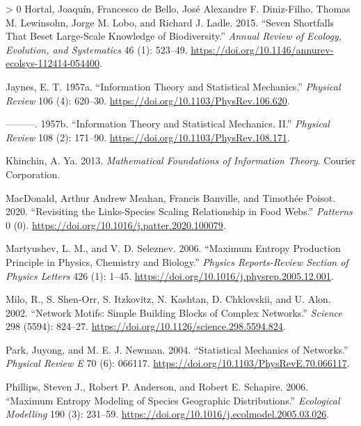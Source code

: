 \documentclass[10pt,oneside]{article}
\newlength{\cslhangindent}
\newenvironment{CSLReferences}[3] %
 {%
  \setlength{\parindent}{0pt}
  \ifodd #1 \everypar{\setlength{\hangindent}{\cslhangindent}}\ignorespaces\fi
  \ifnum #2 > 0
  \setlength{\parskip}{#2\baselineskip}
  \fi
 }%
 {}
\begin{document}
\begin{CSLReferences}{1}{0}
\leavevmode\hypertarget{ref-Hortal2015SevSho}{}%
Hortal, Joaquín, Francesco de Bello, José Alexandre F. Diniz-Filho,
Thomas M. Lewinsohn, Jorge M. Lobo, and Richard J. Ladle. 2015. {``Seven
Shortfalls That Beset Large-Scale Knowledge of Biodiversity.''}
\emph{Annual Review of Ecology, Evolution, and Systematics} 46 (1):
523--49. \url{https://doi.org/10.1146/annurev-ecolsys-112414-054400}.

\leavevmode\hypertarget{ref-Jaynes1957InfThe}{}%
Jaynes, E. T. 1957a. {``Information Theory and Statistical Mechanics.''}
\emph{Physical Review} 106 (4): 620--30.
\url{https://doi.org/10.1103/PhysRev.106.620}.

\leavevmode\hypertarget{ref-Jaynes1957InfThea}{}%
---------. 1957b. {``Information Theory and Statistical Mechanics.
II.''} \emph{Physical Review} 108 (2): 171--90.
\url{https://doi.org/10.1103/PhysRev.108.171}.

\leavevmode\hypertarget{ref-Khinchin2013MatFou}{}%
Khinchin, A. Ya. 2013. \emph{Mathematical Foundations of Information
Theory}. Courier Corporation.

\leavevmode\hypertarget{ref-MacDonald2020RevLin}{}%
MacDonald, Arthur Andrew Meahan, Francis Banville, and Timothée Poisot.
2020. {``Revisiting the Links-Species Scaling Relationship in Food
Webs.''} \emph{Patterns} 0 (0).
\url{https://doi.org/10.1016/j.patter.2020.100079}.

\leavevmode\hypertarget{ref-Martyushev2006MaxEnt}{}%
Martyushev, L. M., and V. D. Seleznev. 2006. {``Maximum Entropy
Production Principle in Physics, Chemistry and Biology.''} \emph{Physics
Reports-Review Section of Physics Letters} 426 (1): 1--45.
\url{https://doi.org/10.1016/j.physrep.2005.12.001}.

\leavevmode\hypertarget{ref-Milo2002NetMot}{}%
Milo, R., S. Shen-Orr, S. Itzkovitz, N. Kashtan, D. Chklovskii, and U.
Alon. 2002. {``Network Motifs: Simple Building Blocks of Complex
Networks.''} \emph{Science} 298 (5594): 824--27.
\url{https://doi.org/10.1126/science.298.5594.824}.

\leavevmode\hypertarget{ref-Park2004StaMeca}{}%
Park, Juyong, and M. E. J. Newman. 2004. {``Statistical Mechanics of
Networks.''} \emph{Physical Review E} 70 (6): 066117.
\url{https://doi.org/10.1103/PhysRevE.70.066117}.

\leavevmode\hypertarget{ref-Phillips2006MaxEnta}{}%
Phillips, Steven J., Robert P. Anderson, and Robert E. Schapire. 2006.
{``Maximum Entropy Modeling of Species Geographic Distributions.''}
\emph{Ecological Modelling} 190 (3): 231--59.
\url{https://doi.org/10.1016/j.ecolmodel.2005.03.026}.


\end{CSLReferences}
\end{document}
